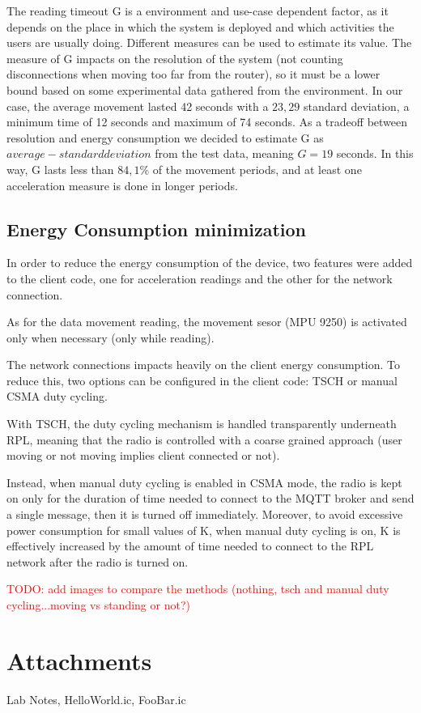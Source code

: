 \documentclass[a4paper, 11pt]{article}
\begin{document}
The reading timeout G is a environment and use-case dependent factor, as it depends on the place in which the system is deployed and which activities the users are usually doing.
Different measures can be used to estimate its value.
The measure of G impacts on the resolution of the system (not counting disconnections when moving too far from the router), so it must be a lower bound based on some experimental data gathered from the environment.
In our case, the average movement lasted 42 seconds with a $23,29$ standard deviation, a minimum time of 12 seconds and maximum of 74 seconds.
As a tradeoff between resolution and energy consumption we decided to estimate G as $average - standard deviation$ from the test data, meaning $G = 19$ seconds.
In this way, G lasts less than $84,1$\% of the movement periods, and at least one acceleration measure is done in longer periods.

\subsection*{Energy Consumption minimization}
In order to reduce the energy consumption of the device, two features were added to the client code, one for acceleration readings and the other for the network connection.

As for the data movement reading, the movement sesor (MPU 9250) is activated only when necessary (only while reading). 

The network connections impacts heavily on the client energy consumption. To reduce this, two options can be configured in the client code: TSCH or manual CSMA duty cycling.

With TSCH, the duty cycling mechanism is handled transparently underneath RPL, meaning that the radio is controlled with a coarse grained approach (user moving or not moving implies client connected or not).

Instead, when manual duty cycling is enabled in CSMA mode, the radio is kept on only for the duration of time needed to  connect to the MQTT broker and send a single message, then it is turned  off immediately.
Moreover, to avoid excessive power consumption for small values of K, when manual duty cycling is on, K is effectively increased by the amount of  time needed to connect to the RPL network after the radio is turned on.

\textcolor{red}{TODO: add images to compare the methods (nothing, tsch and manual duty cycling...moving vs standing or not?)}

\section*{Attachments}
Lab Notes, HelloWorld.ic, FooBar.ic
\end{document}
